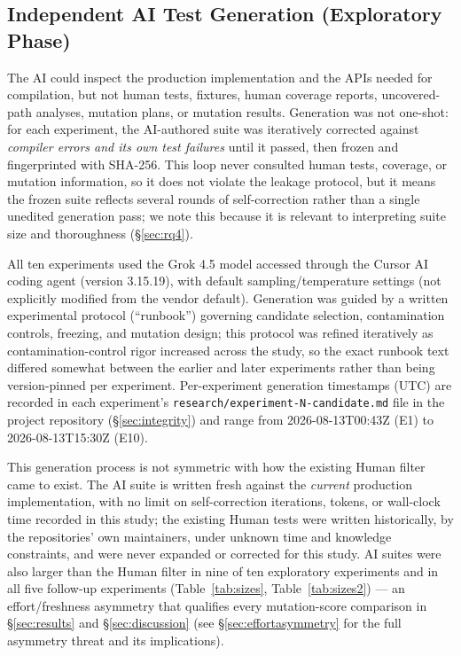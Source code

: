 \documentclass[10pt,conference]{IEEEtran}
\begin{document}
\subsection{Independent AI Test Generation (Exploratory Phase)}
\label{sec:aigen}
The AI could inspect the production implementation and the APIs needed for compilation, but not human tests, fixtures, human coverage reports, uncovered-path analyses, mutation plans, or mutation results. Generation was not one-shot: for each experiment, the AI-authored suite was iteratively corrected against \emph{compiler errors and its own test failures} until it passed, then frozen and fingerprinted with SHA-256. This loop never consulted human tests, coverage, or mutation information, so it does not violate the leakage protocol, but it means the frozen suite reflects several rounds of self-correction rather than a single unedited generation pass; we note this because it is relevant to interpreting suite size and thoroughness (\S\ref{sec:rq4}).

All ten experiments used the Grok 4.5 model accessed through the Cursor AI coding agent (version 3.15.19), with default sampling/temperature settings (not explicitly modified from the vendor default). Generation was guided by a written experimental protocol (``runbook'') governing candidate selection, contamination controls, freezing, and mutation design; this protocol was refined iteratively as contamination-control rigor increased across the study, so the exact runbook text differed somewhat between the earlier and later experiments rather than being version-pinned per experiment. Per-experiment generation timestamps (UTC) are recorded in each experiment's \texttt{research/experiment-N-candidate.md} file in the project repository (\S\ref{sec:integrity}) and range from 2026-08-13T00:43Z (E1) to 2026-08-13T15:30Z (E10).

This generation process is not symmetric with how the existing Human filter came to exist. The AI suite is written fresh against the \emph{current} production implementation, with no limit on self-correction iterations, tokens, or wall-clock time recorded in this study; the existing Human tests were written historically, by the repositories' own maintainers, under unknown time and knowledge constraints, and were never expanded or corrected for this study. AI suites were also larger than the Human filter in nine of ten exploratory experiments and in all five follow-up experiments (Table~\ref{tab:sizes}, Table~\ref{tab:sizes2}) — an effort/freshness asymmetry that qualifies every mutation-score comparison in \S\ref{sec:results} and \S\ref{sec:discussion} (see \S\ref{sec:effortasymmetry} for the full asymmetry threat and its implications).
\end{document}
